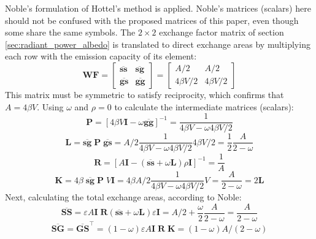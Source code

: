 \documentclass[preprint,1p,times]{elsarticle}
\theoremstyle{plain}
\theoremstyle{definition}
\theoremstyle{remark}
\begin{document}
Noble's formulation of Hottel's method is applied. Noble's matrices (scalars) here should not be confused with the proposed matrices of this paper, even though some share the same symbols. The $2\times 2$ exchange factor matrix of section \ref{sec:radiant_power_albedo} is translated to direct exchange areas by multiplying each row with the emission capacity of its element:
\begin{equation}
	\mathbf{W}\mathbf{F} =
	\begin{bmatrix}
	\overline{\mathbf{ss}} &\overline{\mathbf{sg}}\\
	\overline{\mathbf{gs}} &\overline{\mathbf{gg}}
	\end{bmatrix} = 
	\begin{bmatrix}
	A/2 &A/2\\
	4\beta V/2 &4\beta V/2
	\end{bmatrix}
\end{equation}
This matrix must be symmetric to satisfy reciprocity, which confirms that $A=4\beta V$. Using $\omega$ and $\rho=0$ to calculate the intermediate matrices (scalars):
\begin{equation}
	\mathbf{P} = [4\beta V \mathbf{I}-\omega \overline{\mathbf{gg}}]^{-1} = \frac{1}{4\beta V - \omega 4\beta V/2 }
\end{equation}
\begin{equation}
	\mathbf{L} = \overline{\mathbf{sg}}\;\mathbf{P}\; \overline{\mathbf{gs}} = A/2\frac{1}{4\beta V - \omega 4\beta V/2 }4\beta V/2 = \frac{1}{2}\frac{A}{2 - \omega}
\end{equation}
\begin{equation}
	\mathbf{R} = [A\mathbf{I} - (\overline{\mathbf{ss}}+\omega \mathbf{L})\rho\mathbf{I}]^{-1} =
\frac{1}{A}
\end{equation}
\begin{equation}
	\mathbf{K} = 4 \beta\; \overline{\mathbf{sg}}\; \mathbf{P}\; V\mathbf{I} = 4\beta A/2 \frac{1}{4\beta V - \omega 4\beta V/2 } V = 
	\frac{A}{2 - \omega } = 2 \mathbf{L}
\end{equation}
Next, calculating the total exchange areas, according to Noble:
\begin{equation}
	\overline{\mathbf{SS}} = \varepsilon A\mathbf{I}\;\mathbf{R} (\overline{\mathbf{ss}}+\omega\mathbf{L})\varepsilon \mathbf{I} = A/2+\frac{\omega}{2}\frac{A}{2 - \omega} = \frac{A}{2-\omega}
	\label{eq:SS}
\end{equation}
\begin{equation}
	\overline{\mathbf{SG}} = \overline{\mathbf{GS}}^\top =
	(1-\omega)\varepsilon A\mathbf{I}\;\mathbf{R}\;\mathbf{K} = (1-\omega)A/(2-\omega)
\end{equation}
\end{document}
